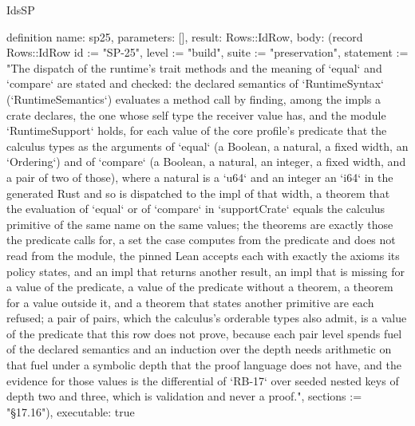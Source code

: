 \begin{lexlean}{IdsSP}
\begin{semanticmodule}
definition{
  name: sp25,
  parameters: [],
  result: Rows::IdRow,
  body: (record Rows::IdRow {id := "SP-25", level := "build", suite := "preservation", statement := "The dispatch of the runtime's trait methods and the meaning of `equal` and `compare` are stated and checked: the declared semantics of `RuntimeSyntax` (`RuntimeSemantics`) evaluates a method call by finding, among the impls a crate declares, the one whose self type the receiver value has, and the module `RuntimeSupport` holds, for each value of the core profile's predicate that the calculus types as the arguments of `equal` (a Boolean, a natural, a fixed width, an `Ordering`) and of `compare` (a Boolean, a natural, an integer, a fixed width, and a pair of two of those), where a natural is a `u64` and an integer an `i64` in the generated Rust and so is dispatched to the impl of that width, a theorem that the evaluation of `equal` or of `compare` in `supportCrate` equals the calculus primitive of the same name on the same values; the theorems are exactly those the predicate calls for, a set the case computes from the predicate and does not read from the module, the pinned Lean accepts each with exactly the axioms its policy states, and an impl that returns another result, an impl that is missing for a value of the predicate, a value of the predicate without a theorem, a theorem for a value outside it, and a theorem that states another primitive are each refused; a pair of pairs, which the calculus's orderable types also admit, is a value of the predicate that this row does not prove, because each pair level spends fuel of the declared semantics and an induction over the depth needs arithmetic on that fuel under a symbolic depth that the proof language does not have, and the evidence for those values is the differential of `RB-17` over seeded nested keys of depth two and three, which is validation and never a proof.", sections := "§17.16"}),
  executable: true
}


\end{semanticmodule}
\end{lexlean}
